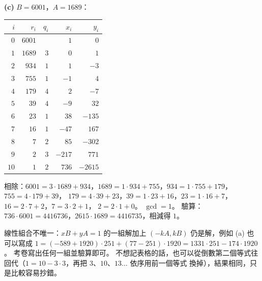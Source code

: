 \begin{pastsoln}
\textbf{(c)} $B = 6001$，$A = 1689$：
\begin{center}
\begin{tabular}{rrrrr}
\toprule
$i$ & $r_i$ & $q_i$ & $x_i$ & $y_i$ \\
\midrule
$0$ & $6001$ & & $1$ & $0$ \\
$1$ & $1689$ & $3$ & $0$ & $1$ \\
$2$ & $934$ & $1$ & $1$ & $-3$ \\
$3$ & $755$ & $1$ & $-1$ & $4$ \\
$4$ & $179$ & $4$ & $2$ & $-7$ \\
$5$ & $39$ & $4$ & $-9$ & $32$ \\
$6$ & $23$ & $1$ & $38$ & $-135$ \\
$7$ & $16$ & $1$ & $-47$ & $167$ \\
$8$ & $7$ & $2$ & $85$ & $-302$ \\
$9$ & $2$ & $3$ & $-217$ & $771$ \\
$10$ & $1$ & $2$ & $736$ & $-2615$ \\
\bottomrule
\end{tabular}
\end{center}
相除：$6001 = 3 \cdot 1689 + 934$，$1689 = 1 \cdot 934 + 755$，$934 = 1 \cdot 755 + 179$，$755 = 4 \cdot 179 + 39$，
$179 = 4 \cdot 39 + 23$，$39 = 1 \cdot 23 + 16$，$23 = 1 \cdot 16 + 7$，$16 = 2 \cdot 7 + 2$，$7 = 3 \cdot 2 + 1$，
$2 = 2 \cdot 1 + 0$。 $\gcd = 1$。 驗算：$736 \cdot 6001 = 4416736$，$2615 \cdot 1689 = 4416735$，相減得 $1$。

線性組合不唯一：$x B + y A = 1$ 的一組解加上 $(-kA, kB)$ 仍是解，例如 (a) 也可以寫成
$1 = (-589 + 1920) \cdot 251 + (77 - 251) \cdot 1920 = 1331 \cdot 251 - 174 \cdot 1920$。 考卷寫出任何一組並驗算即可。
不想記表格的話，也可以從倒數第二個等式往回代（$1 = 10 - 3 \cdot 3$，再把 $3$、$10$、$13 \ldots$ 依序用前一個等式
換掉），結果相同，只是比較容易抄錯。
\end{pastsoln}
